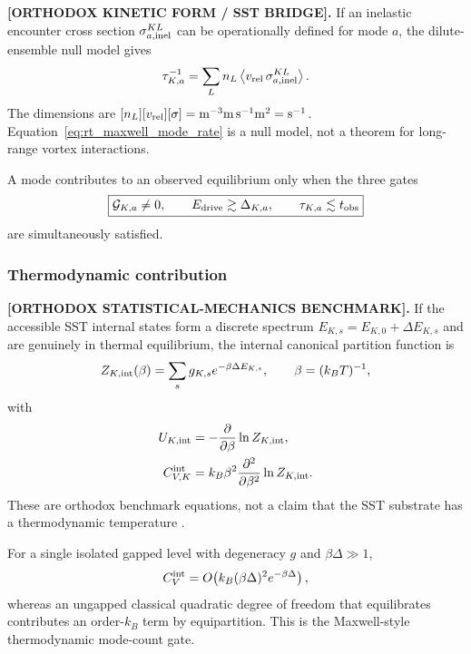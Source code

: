 \textbf{[ORTHODOX KINETIC FORM / SST BRIDGE].}
If an inelastic encounter cross section $\sigma^{KL}_{a,\rm inel}$ can be
operationally defined for mode $a$, the dilute-ensemble null model gives
\begin{equation}
    \tau^{-1}_{K,a}
    =
    \sum_L n_L
    \left\langle
        v_{\rm rel}\,
        \sigma^{KL}_{a,\rm inel}
    \right\rangle .
    \label{eq:rt_maxwell_mode_rate}
\end{equation}
The dimensions are
$[n_L][v_{\rm rel}][\sigma]={\rm m^{-3}m\,s^{-1}m^2}={\rm s^{-1}}$.
Equation~\eqref{eq:rt_maxwell_mode_rate} is a null model, not a theorem for
long-range vortex interactions.

A mode contributes to an observed equilibrium only when the three gates
\begin{equation}
    \boxed{
    \mathcal G_{K,a}\neq0,
    \qquad
    E_{\rm drive}\gtrsim\Delta_{K,a},
    \qquad
    \tau_{K,a}\lesssim t_{\rm obs}
    }
    \label{eq:rt_maxwell_three_gate_condition}
\end{equation}
are simultaneously satisfied.

\subsubsection{Thermodynamic contribution}

\textbf{[ORTHODOX STATISTICAL-MECHANICS BENCHMARK].}
If the accessible SST internal states form a discrete spectrum
$E_{K,s}=E_{K,0}+\Delta E_{K,s}$ and are genuinely in thermal equilibrium,
the internal canonical partition function is
\begin{equation}
    Z_{K,\rm int}(\beta)
    =
    \sum_s g_{K,s}
    e^{-\beta\Delta E_{K,s}},
    \qquad
    \beta=(k_BT)^{-1},
    \label{eq:rt_maxwell_internal_partition}
\end{equation}
with
\begin{align}
    U_{K,\rm int}
    &=
    -\frac{\partial}{\partial\beta}
    \ln Z_{K,\rm int},
    \label{eq:rt_maxwell_internal_energy}\\
    C_{V,K}^{\rm int}
    &=
    k_B\beta^2
    \frac{\partial^2}{\partial\beta^2}
    \ln Z_{K,\rm int}.
    \label{eq:rt_maxwell_internal_heat_capacity}
\end{align}
These are orthodox benchmark equations, not a claim that the SST substrate has
a thermodynamic temperature \cite{PathriaBeale2011}.

For a single isolated gapped level with degeneracy $g$ and
$\beta\Delta\gg1$,
\begin{equation}
    C_V^{\rm int}
    =
    O\!\left(
        k_B(\beta\Delta)^2e^{-\beta\Delta}
    \right),
    \label{eq:rt_maxwell_lowT_gap_suppression}
\end{equation}
whereas an ungapped classical quadratic degree of freedom that equilibrates
contributes an order-$k_B$ term by equipartition.  This is the Maxwell-style
thermodynamic mode-count gate.

